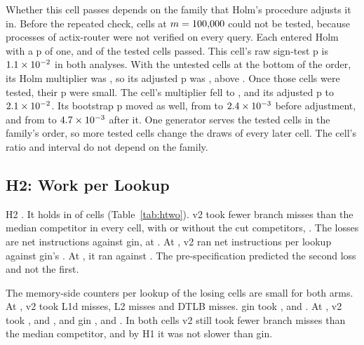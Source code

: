 Whether this cell passes depends on the family that Holm's procedure adjusts it in. Before the
repeated check, \HOneAsIsUntested{} cells at $m=100{,}000$ could not be tested, because
processes of actix-router were not verified on every query. Each entered Holm with a p of one, and
\HOneAsIsPassed{} of the \HOneAsIsTested{} tested cells passed. This cell's raw sign-test p is
$1.1\times10^{-2}$ in both analyses. With the untested cells at the bottom of the order,
its Holm multiplier was \HOneHolmMultiplierBeforeMixedDisjointTen, so its adjusted p was
\HOnePSignHolmBeforeMixedDisjointTen, above \Alpha. Once those cells were tested, their p were small. The
cell's multiplier fell to \HOneHolmMultiplierAfterMixedDisjointTen, and its adjusted p to
$2.1\times10^{-2}$. Its bootstrap p moved as well, from
\HOnePBootRawBeforeMixedDisjointTen{} to $2.4\times10^{-3}$ before adjustment, and from
\HOnePBootHolmBeforeMixedDisjointTen{} to $4.7\times10^{-3}$ after it. One generator serves the tested cells in the
family's order, so more tested cells change the draws of every later cell. The cell's ratio and
interval do not depend on the family.

\subsection{H2: Work per Lookup}\label{sec:htwo}

H2 \HTwoVerdict. It holds in \HTwoHeld{} of \HTwoJudged{} cells (Table~\ref{tab:htwo}). v2 took fewer
branch misses than the median competitor in every cell, with or without the cut competitors,
\HTwoCutArms. The \HTwoLost{} losses are net instructions against gin, at \HTwoLostCells. At
, v2 ran \HTwoVtwoNetParamLastTen{} net instructions per lookup against gin's
\HTwoFastestNetParamLastTen. At , it ran \HTwoVtwoNetMixedDisjointTen{} against
\HTwoFastestNetMixedDisjointTen. The pre-specification predicted the second loss and not the first.

The memory-side counters per lookup of the losing cells are small for both arms. At
, v2 took \HTwoVtwoLOneDParamLastTen{} L1d misses, \HTwoVtwoLTwoParamLastTen{} L2
misses and \HTwoVtwoDtlbParamLastTen{} DTLB misses. gin took \HTwoFastestLOneDParamLastTen,
\HTwoFastestLTwoParamLastTen{} and \HTwoFastestDtlbParamLastTen. At , v2 took
\HTwoVtwoLOneDMixedDisjointTen, \HTwoVtwoLTwoMixedDisjointTen{} and \HTwoVtwoDtlbMixedDisjointTen,
and gin \HTwoFastestLOneDMixedDisjointTen, \HTwoFastestLTwoMixedDisjointTen{} and
\HTwoFastestDtlbMixedDisjointTen. In both cells v2 still took fewer branch misses than the median
competitor, and by H1 it was not slower than gin.

